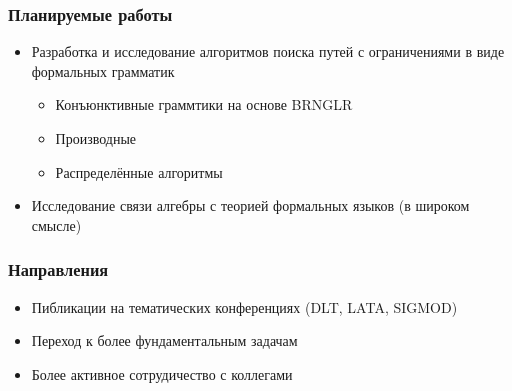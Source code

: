 \documentclass[xcolor=table]{beamer}
\begin{document}
\begin{frame}[fragile]
  \transwipe[direction=90]
  \frametitle{Планируемые работы}
\begin{itemize}
      \item Разработка и исследование алгоритмов поиска путей с ограничениями в виде формальных грамматик
      \begin{itemize}
        \item Конъюнктивные граммтики на основе BRNGLR
        \item Производные
        \item Распределённые алгоритмы
      \end{itemize}
      \item Исследование связи алгебры с теорией формальных языков (в широком смысле) 
\end{itemize}
\end{frame}

\begin{frame}[fragile]
  \transwipe[direction=90]
  \frametitle{Направления}
\begin{itemize}
      \item Пибликации на тематических конференциях (DLT, LATA, SIGMOD)
      \item Переход к более фундаментальным задачам
      \item Более активное сотрудичество с коллегами
\end{itemize}
\end{frame}
\end{document}
